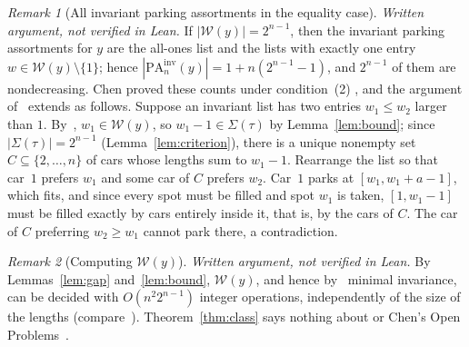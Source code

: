 \documentclass[11pt]{article}
\theoremstyle{remark}
\newtheorem{remark}{Remark}
\newcommand{\W}{\mathcal W}
\newcommand{\PA}{\mathrm{PA}}
\newcommand{\Sub}{\Sigma}
\begin{document}
\begin{remark}[All invariant parking assortments in the equality case]\label{rem:vectors}
\emph{Written argument, not verified in Lean.} If $|\W(y)|=2^{n-1}$, then the
invariant parking assortments for $y$ are the all-ones list and the lists with
exactly one entry $w\in\W(y)\setminus\{1\}$; hence
$|\PA^{\mathrm{inv}}_n(y)|=1+n(2^{n-1}-1)$, and $2^{n-1}$ of them are
nondecreasing. Chen proved these counts under condition~(2)
\cite[Theorem~E(c)]{chen}, and the argument of~\cite[Claim~4.5.3]{chen}
extends as follows. Suppose an invariant list has two entries $w_1\le w_2$
larger than $1$. By~\cite[Lemma~4.2]{chen}, $w_1\in\W(y)$, so $w_1-1\in\Sub(\tau)$ by
Lemma~\ref{lem:bound}; since $|\Sub(\tau)|=2^{n-1}$ (Lemma~\ref{lem:criterion}),
there is a unique nonempty set $C\subseteq\{2,\dots,n\}$ of cars whose lengths
sum to $w_1-1$. Rearrange the list so that car~$1$ prefers $w_1$ and some car
of $C$ prefers $w_2$. Car~$1$ parks at $[w_1,w_1+a-1]$, which fits, and since
every spot must be filled and spot $w_1$ is taken, $[1,w_1-1]$ must be filled
exactly by cars entirely inside it, that is, by the cars of $C$. The car of $C$
preferring $w_2\ge w_1$ cannot park there, a contradiction.
\end{remark}

\begin{remark}[Computing $\W(y)$]\label{rem:algo}
\emph{Written argument, not verified in Lean.} By Lemmas~\ref{lem:gap}
and~\ref{lem:bound}, $\W(y)$, and hence by~\cite[Theorem~4.5]{chmps} minimal
invariance, can be decided with $O(n^2 2^{n-1})$ integer operations,
independently of the size of the lengths (compare~\cite[Remark~4.6]{chmps}).
Theorem~\ref{thm:class} says nothing about \cite[Open Problem~2]{chmps} or
Chen's Open Problems~\cite[Section~5]{chen}.
\end{remark}
\end{document}
